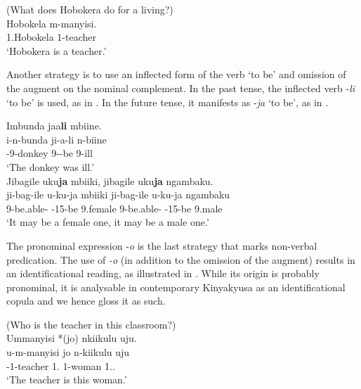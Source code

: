 \documentclass[output=paper]{langscibook}
\begin{document}
\ex
\label{bkm:Ref122533754:b}
(What does Hobokera do for a living?)\\
\gll
Hobokela  m-manyisi.\\
1.Hobokela  1-teacher\\
\glt
‘Hobokera is a teacher.’\\

\z
\z

Another strategy is to use an inflected form of the verb ‘to be’ and omission of the augment on the nominal complement. In the past tense, the inflected verb -\textit{li} ‘to be’ is used, as in . In the future tense, it manifests as -\textit{ja} ‘to be’, as in .

\ea
\label{bkm:Ref122533774}
\ea
\label{bkm:Ref122533774:a}
Imbunda jaa\textbf{li} mbiine.\\
\gll
i-n-bunda  ji-a-li  n-biine\\
\AUG{}-9-donkey  9\SM{}-\PST{}-be  9-ill\\
\glt
‘The donkey was ill.’\\

\ex
\label{bkm:Ref122533774:b}
Jibagile uku\textbf{ja} mbiiki, jibagile uku\textbf{ja} ngambaku.\\
\gll
ji-bag-ile  u-ku-ja  mbiiki  ji-bag-ile  u-ku-ja  ngambaku\\
9\SM{}-be.able-\PFV{}  \AUG{}-15-be  9.female  9\SM{}-be.able-\PFV{}  \AUG{}-15-be  9.male\\
\glt
‘It may be a female one, it may be a male one.’\\

\z
\z

The pronominal expression -\textit{o} is the last strategy that marks non-verbal predication. The use of \textit{-o} (in addition to the omission of the augment) results in an identificational reading, as illustrated in . While its origin is probably pronominal, it is analysable in contemporary Kinyakyusa as an identificational copula and we hence gloss it as such.

\ea
\label{bkm:Ref148770976}
(Who is the teacher in this classroom?)\\
Ummanyisi *(jo) nkiikulu uju.\\
\gll
u-m-manyisi  jo  n-kiikulu  uju\\
\AUG{}-1-teacher  1.\IDCOP{}  1-woman  1.\DEM.\PROX{}\\
\glt
  ‘The teacher is this woman.’
\end{document}
